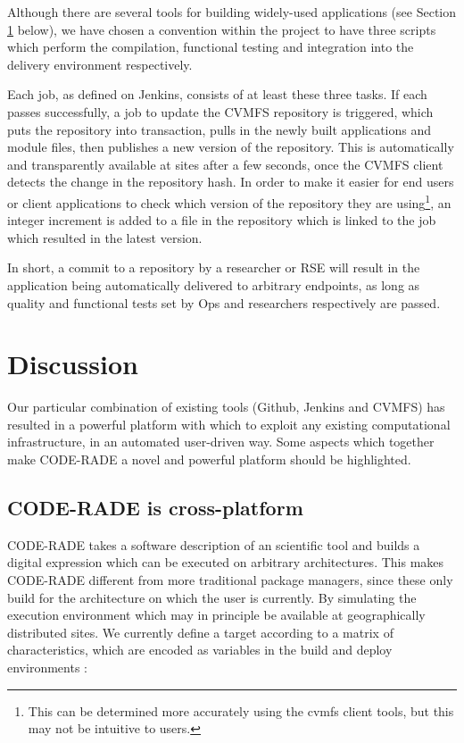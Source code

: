 \documentclass[a4paper]{jpconf}
\begin{document}
    Although there are several tools for building widely-used applications (see Section
    \ref{Discussion} below), we have chosen a convention within the project to have three scripts
    which perform the compilation, functional testing and integration into the delivery environment
    respectively. 
    

Each job, as defined on Jenkins, consists of at least these three tasks. If each passes successfully,
a job to update the CVMFS repository is triggered, which puts the repository into transaction, pulls
in the newly built applications and module files, then publishes a new version of the repository.
This is automatically and transparently available at sites after a few seconds, once the CVMFS
client detects the change in the repository hash. In order to make it easier for end users or client
applications to check which version of the repository they are using\footnote{This can be determined
more accurately using the cvmfs client tools, but this may not be intuitive to users.}, an integer
increment is added to a file in the repository which is linked to the job which resulted in the
latest version.

In short, a commit to a repository by a researcher or RSE will result in the application being
automatically delivered to arbitrary endpoints, as long as quality and functional tests set by Ops
and researchers respectively are passed.

	\section{Discussion}\label{Discussion}

Our particular combination of existing tools (Github, Jenkins and CVMFS) has resulted in a powerful
platform with which to exploit any existing computational infrastructure, in an automated
user-driven way. Some aspects which together make CODE-RADE a novel and powerful platform should be
highlighted.

\subsection{CODE-RADE is cross-platform}

CODE-RADE takes a software description of an scientific tool and builds a digital expression which
can be executed on arbitrary architectures. This makes CODE-RADE different from more traditional
package managers, since these only build for the architecture on which the user is currently. By
simulating the execution environment which may in principle be available at geographically
distributed sites. We currently define a target according to a matrix of characteristics, which are
encoded as variables in the build and deploy environments :
\end{document}
